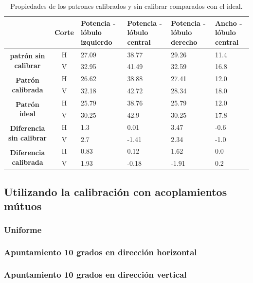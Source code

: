 \begin{table}[H]
  \footnotesize
  \centering
  \begin{tabular}{|c|c|p{2cm}|p{2cm}|p{2cm}|p{2cm}|}
    \cline{2-6}
    \multicolumn{1}{c|}{} & \textbf{Corte} & \textbf{Potencia - lóbulo izquierdo} & \textbf{Potencia - lóbulo central} &
    \textbf{Potencia - lóbulo derecho} & \textbf{Ancho - lóbulo central} \tabularnewline\hline
    \multirow{2}{*}{\textbf{patrón sin calibrar}} & H & 27.09 & 38.77 & 29.26 & 11.4 \tabularnewline\cline{2-6}
     & V & 32.95 & 41.49 & 32.59 & 16.8 \tabularnewline\hline
    \multirow{2}{*}{\textbf{Patrón calibrada}} & H & 26.62 & 38.88 & 27.41 & 12.0 \tabularnewline\cline{2-6}
     & V & 32.18 & 42.72 & 28.34 & 18.0 \tabularnewline\hline
    \multirow{2}{*}{\textbf{Patrón ideal}} & H & 25.79 & 38.76 & 25.79 & 12.0 \tabularnewline\cline{2-6}
     & V & 30.25 & 42.9 & 30.25 & 17.8 \tabularnewline\hline
    \multirow{2}{*}{\textbf{Diferencia sin calibrar}} & H & 1.3 & 0.01 & 3.47 & -0.6\tabularnewline\cline{2-6}
     & V & 2.7 & -1.41 & 2.34 & -1.0 \tabularnewline\hline
    \multirow{2}{*}{\textbf{Diferencia calibrada}} & H & 0.83 & 0.12 & 1.62 & 0.0 \tabularnewline\cline{2-6}
     & V & 1.93 & -0.18 & -1.91 & 0.2 \tabularnewline\hline
  \end{tabular}
  \caption{Propiedades de los patrones calibrados y sin calibrar comparados con el ideal.}
  \label{tab:compErrClassical10degRow}
\end{table}


\subsection{Utilizando la calibración con acoplamientos mútuos}

\subsubsection{Uniforme}

\subsubsection{Apuntamiento 10 grados en dirección horizontal}

\subsubsection{Apuntamiento 10 grados en dirección vertical}


